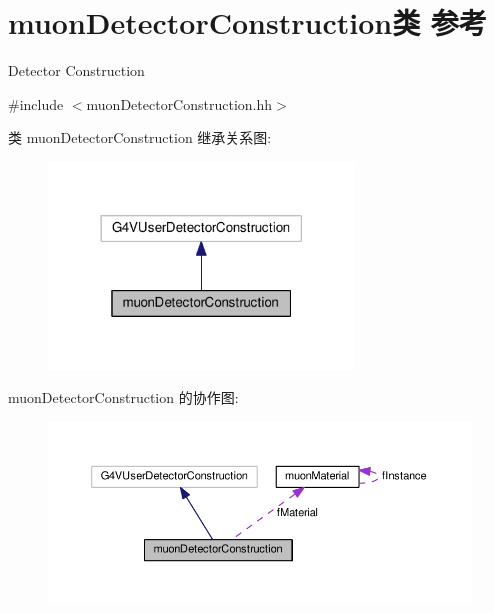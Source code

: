\hypertarget{classmuonDetectorConstruction}{}\section{muon\+Detector\+Construction类 参考}
\label{classmuonDetectorConstruction}


Detector Construction  




{\ttfamily \#include $<$muon\+Detector\+Construction.\+hh$>$}



类 muon\+Detector\+Construction 继承关系图\+:\nopagebreak
\begin{figure}[H]
\begin{center}
\leavevmode
\includegraphics[width=230pt]{classmuonDetectorConstruction__inherit__graph}
\end{center}
\end{figure}


muon\+Detector\+Construction 的协作图\+:\nopagebreak
\begin{figure}[H]
\begin{center}
\leavevmode
\includegraphics[width=350pt]{classmuonDetectorConstruction__coll__graph}
\end{center}
\end{figure}
